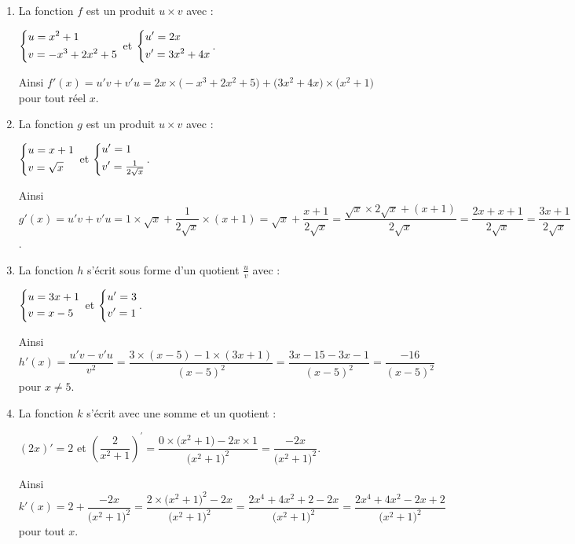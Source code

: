 \documentclass[a4paper,11pt]{article}
\begin{document}
\begin{enumerate}
	\item La fonction $f$ est un produit $u \times v$ avec :
	
	\tabula{}$\begin{dcases}u=x^2+1 \\ v=-x^3+2x^2+5\end{dcases}$ et $\begin{dcases}u'=2x \\ v'=3x^2+4x\end{dcases}$.
	
	Ainsi $f'(x)=u'v+v'u=2x \times \big(-x^3+2x^2+5\big) + \big(3x^2+4x\big) \times \big( x^2+1 \big)$ pour tout réel $x$.
	\item La fonction $g$ est un produit $u \times v$ avec :
	
	\tabula{}$\begin{dcases}u=x+1 \\ v=\sqrt{x}\end{dcases}$ et $\begin{dcases}u'=1 \\ v'=\tfrac{1}{2\sqrt{x}}\end{dcases}$.
	
	Ainsi $g'(x)=u'v+v'u=1 \times \sqrt{x} +  \dfrac{1}{2\sqrt{x}} \times (x+1) = \sqrt{x} + \dfrac{x+1}{2\sqrt{x}} = \dfrac{\sqrt{x} \times 2\sqrt{x} + (x+1)}{2\sqrt{x}} = \dfrac{2x+x+1}{2\sqrt{x}}=\dfrac{3x+1}{2\sqrt{x}}$.
	\item La fonction $h$ s'écrit sous forme d'un quotient $\tfrac{u}{v}$ avec :
	
	\tabula{}$\begin{dcases}u=3x+1 \\ v=x-5\end{dcases}$ et $\begin{dcases}u'=3 \\ v'=1\end{dcases}$.
	
	Ainsi $h'(x)=\dfrac{u'v-v'u}{v^2} = \dfrac{3 \times (x-5) - 1 \times (3x+1)}{(x-5)^2}=\dfrac{3x-15-3x-1}{(x-5)^2}=\dfrac{-16}{(x-5)^2}$ pour $x \neq 5$.
	\item La fonction $k$ s'écrit avec une somme et un quotient :
	
	\tabula{}$(2x)'=2$ et $\left( \dfrac{2}{x^2+1} \right)^{\prime} = \dfrac{0 \times \big(x^2+1\big)-2x \times 1}{\big(x^2+1\big)^2}=\dfrac{-2x}{\big(x^2+1\big)^2}$.
	
	Ainsi $k'(x)=2 + \dfrac{-2x}{\big(x^2+1\big)^2} = \dfrac{2 \times \big(x^2+1\big)^2-2x}{\big(x^2+1\big)^2} = \dfrac{2x^4+4x^2+2-2x}{\big(x^2+1\big)^2} = \dfrac{2x^4+4x^2-2x+2}{\big(x^2+1\big)^2}$ pour tout $x$.
\end{enumerate}
\end{document}

